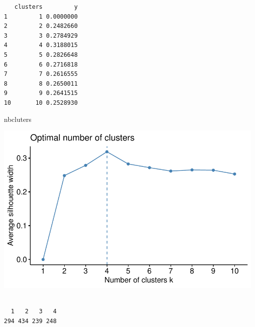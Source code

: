 \documentclass[
  letterpaper,
  DIV=11,
  numbers=noendperiod]{scrartcl}
\newenvironment{Shaded}{\begin{snugshade}}{\end{snugshade}}
\newcommand{\AttributeTok}[1]{\textcolor[rgb]{0.40,0.45,0.13}{#1}}
\newcommand{\CommentTok}[1]{\textcolor[rgb]{0.37,0.37,0.37}{#1}}
\newcommand{\DecValTok}[1]{\textcolor[rgb]{0.68,0.00,0.00}{#1}}
\newcommand{\FunctionTok}[1]{\textcolor[rgb]{0.28,0.35,0.67}{#1}}
\newcommand{\NormalTok}[1]{\textcolor[rgb]{0.00,0.23,0.31}{#1}}
\newcommand{\OtherTok}[1]{\textcolor[rgb]{0.00,0.23,0.31}{#1}}
\newcommand{\SpecialCharTok}[1]{\textcolor[rgb]{0.37,0.37,0.37}{#1}}
\begin{document}
\begin{verbatim}
   clusters         y
1         1 0.0000000
2         2 0.2482660
3         3 0.2784929
4         4 0.3188015
5         5 0.2826648
6         6 0.2716818
7         7 0.2616555
8         8 0.2650011
9         9 0.2641515
10       10 0.2528930
\end{verbatim}

\begin{Shaded}
\begin{Highlighting}[]
\NormalTok{nbcluters}
\end{Highlighting}
\end{Shaded}

\includegraphics{ctrl+R_files/figure-pdf/unnamed-chunk-13-1.pdf}

\begin{Shaded}
\end{Shaded}

\begin{verbatim}

  1   2   3   4 
294 434 239 248 
\end{verbatim}

\begin{Shaded}
\end{Shaded}
\end{document}
